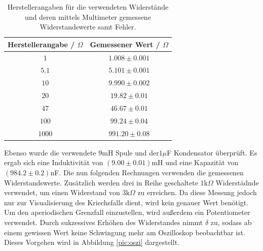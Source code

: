 \documentclass[a4paper, 12pt]{scrartcl}
\begin{document}
\begin{table}[H]
\centering
\begin{tabular}{c|c}
Herstellerangabe / $\Omega$ & Gemessener Wert / $\Omega$ \\
\hline
$1$ & $1.008 \pm 0.001$ \\
$5.1$ & $5.101 \pm 0.001$ \\
$10$ & $9.990 \pm 0.002$ \\
$20$ & $19.82 \pm 0.01$ \\
$47$ & $46.67 \pm 0.01$ \\
$100$ & $99.24 \pm 0.04$ \\
$1000$ & $991.20\pm 0.08$
\end{tabular}
\caption{Herstellerangaben für die verwendeten Widerstände und deren mittels Multimeter gemessene Widerstandswerte samt Fehler.}
\label{tab:widerstaende}
\end{table}
Ebenso wurde die verwendete $9$mH Spule und der$1\mu$F Kondensator überprüft. Es ergab sich eine Induktivität von $(9.00 \pm 0.01)$mH und eine Kapazität von $(984.2 \pm 0.2)$nF.
Die nun folgenden Rechnungen verwenden die gemessenen Widerstandswerte. Zusätzlich werden drei in Reihe geschaltete $1\text{k}\Omega$ Widerstädnde verwendet, um einen Widerstand von $3\text{k}\Omega$ zu erreichen. Da diese Messung jedoch nur zur Visualisierung des Kriechsfalls dient, wird kein genauer Wert benötigt. Um den aperiodischen Grenzfall einzustellen, wird außerdem ein Potentiometer verwendet. Durch sukzessives Erhöhen des Widerstandes nimmt $\delta$ zu, sodass ab einem gewissen Wert keine Schwingung mehr am Oszilloskop beobachtbar ist. Dieses Vorgehen wird in Abbildung \ref{pic:oszi} dargestellt.
\end{document}

